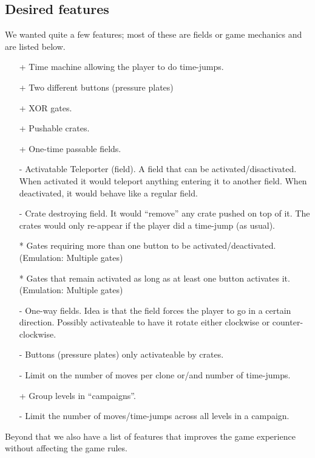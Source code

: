 \subsection{Desired features}
We wanted quite a few features; most of these are fields or game
mechanics and are listed below.

\begin{itemize}
\item[+] Time machine allowing the player to do time-jumps.
\item[+] Two different buttons (pressure plates)
\item[+] XOR gates.
\item[+] Pushable crates.
\item[+] One-time passable fields.
\item[-] Activatable Teleporter (field).  A field that can be
  activated/disactivated.  When activated it would teleport anything
  entering it to another field.  When deactivated, it would behave
  like a regular field.
\item[-] Crate destroying field.  It would ``remove'' any crate pushed
  on top of it.  The crates would only re-appear if the player did a
  time-jump (as usual).
\item[*] Gates requiring more than one button to be activated/deactivated.
 (Emulation: Multiple gates)
\item[*] Gates that remain activated as long as at least one button activates
 it.  (Emulation: Multiple gates)
\item[-] One-way fields.  Idea is that the field forces the player to go
 in a certain direction.  Possibly activateable to have it rotate either
 clockwise or counter-clockwise.
\item[-] Buttons (pressure plates) only activateable by crates.
\item[-] Limit on the number of moves per clone or/and number of time-jumps.
\item[+] Group levels in ``campaigns''.
\item[-] Limit the number of moves/time-jumps across all levels in a campaign.
\end{itemize}

Beyond that we also have a list of features that improves the game
experience without affecting the game rules.

